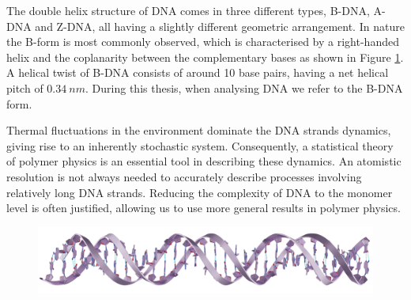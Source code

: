 The double helix structure of DNA comes in three different types, B-DNA, A-DNA and Z-DNA,
all having a slightly different geometric arrangement. In nature the B-form is most
commonly observed, which is characterised by a right-handed helix and the coplanarity
between the complementary bases as shown in Figure \ref{fig:DNA}. A helical twist of
B-DNA consists of around 10 base pairs, having a net helical pitch of $0.34\ nm$. During
this thesis, when analysing DNA we refer to the B-DNA form.


Thermal fluctuations in the environment dominate the DNA strands dynamics, giving rise to
an inherently stochastic system. Consequently, a statistical theory of polymer physics
is an essential tool in describing these dynamics.  An atomistic
resolution is not always needed to accurately describe processes involving
relatively long DNA strands.  Reducing the complexity of DNA to the monomer level is
often justified, allowing us to use more general results in polymer physics.

\begin{figure}[h!]
   \centering
   \includegraphics[width=\linewidth]{Figures/DNAStrand2.png}
   \caption[Figure showing the double helical structure of
   DNA.]{\linespread{0.816}{\small Figure of the double helical structure of
   DNA, here in the B-DNA form as it is the most commonly observed in nature. The
   phosphate backbones are represented as ribbons, enclosing the bases forming coplanar
   hydrogen bonds. Image was made in Blender, using generated PDB data.}}
   \label{fig:DNA}
\end{figure}
